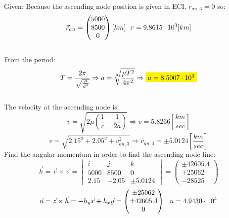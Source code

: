 Given:
Because the ascending node position is given in ECI, $ r_{an, 3} = 0$ so: 
\begin{equation}
    \vec{r}_{an} = \begin{pmatrix}
            5000\\8500\\0
        \end{pmatrix} [km] \hspace{0.25cm} r = 9.8615 \cdot 10^3 [km]
\end{equation}
\\
From the period:
\begin{equation}
    T = \frac{2\pi}{\sqrt{\frac{\mu}{a^3}}}
    \Rightarrow
    a = \sqrt[3]{\frac{\mu T^2}{4\pi ^2}}
    \Rightarrow
    \colorbox{yellow}{$a = 8.5007 \cdot 10^3$}
\end{equation}
\\
The velocity at the ascending node is:
\begin{equation}
    v = \sqrt{2\mu \left(\frac{1}{r} - \frac{1}{2a}\right)}
    \Rightarrow
    v = 5.8266 \left[\frac{km}{sec}\right] 
\end{equation}
\begin{equation}
    v = \sqrt{2.15^2 + 2.05^2 + v_{an, 3}^2} 
    \Rightarrow
    v_{an, 3} = \pm 5.0124 \left[\frac{km}{sec}\right] 
\end{equation}
Find the angular momentum in order to find the ascending node line:
\begin{equation}
    \vec{h} = \vec{r} \times \vec{v} = \begin{vmatrix}
        i & j & k \\ 5000 & 8500 & 0 \\ 2.15 & -2.05 & \pm 5.0124
    \end{vmatrix} = \begin{pmatrix}
        \pm 42605.4 \\ \mp 25062 \\ -28525
    \end{pmatrix}
\end{equation}
\begin{equation}
    \vec{n} = \vec{z} \times \vec{h} = -h_y\vec{x}+h_x\vec{y} = \begin{pmatrix}
        \pm 25062 \\ \pm 42605.4 \\ 0
    \end{pmatrix}
    \hspace{0.25cm} n = 4.9430\cdot 10^4
\end{equation}
